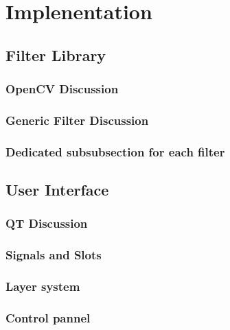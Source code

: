 \section{Implenentation}

\subsection{Filter Library}

\subsubsection{OpenCV Discussion}

\subsubsection{Generic Filter Discussion}

\subsubsection{Dedicated subsubsection for each filter}


\subsection{User Interface}

\subsubsection{QT Discussion}

\subsubsection{Signals and Slots}

\subsubsection{Layer system}

\subsubsection{Control pannel}

